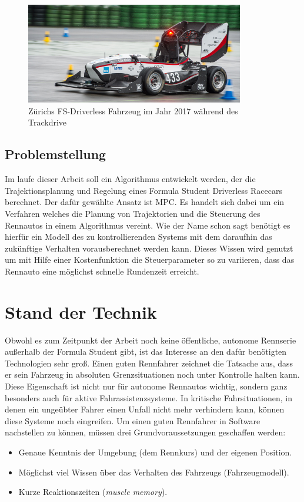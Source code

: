\documentclass{like}
\begin{document}
\begin{figure}[hb!]
	\centering
	\includegraphics[width=270pt]{Abbildungen/amz-driverless-long.jpg}
	\caption{Zürichs FS-Driverless Fahrzeug im Jahr 2017 während des Trackdrive}
\end{figure}

\section{Problemstellung}
Im laufe dieser Arbeit soll ein Algorithmus entwickelt werden, der die Trajektionsplanung und Regelung eines Formula Student Driverless Racecars berechnet. Der dafür gewählte Ansatz ist \acl{MPC}. Es handelt sich dabei um ein Verfahren welches die Planung von Trajektorien und die Steuerung des Rennautos in einem Algorithmus vereint. Wie der Name schon sagt benötigt es hierfür ein Modell des zu kontrollierenden Systems mit dem daraufhin das zukünftige Verhalten vorausberechnet werden kann. Dieses Wissen wird genutzt um mit Hilfe einer Kostenfunktion die Steuerparameter so zu variieren, dass das Rennauto eine möglichst schnelle Rundenzeit erreicht.

\chapter{Stand der Technik}
Obwohl es zum Zeitpunkt der Arbeit noch keine öffentliche, autonome Rennserie außerhalb der Formula Student gibt, ist das Interesse an den dafür benötigten Technologien sehr groß.
Einen guten Rennfahrer zeichnet die Tatsache aus, dass er sein Fahrzeug in absoluten Grenzsituationen noch unter Kontrolle halten kann. Diese Eigenschaft ist nicht nur für autonome Rennautos wichtig, sondern ganz besonders auch für aktive Fahrassistenzsysteme. In kritische Fahrsituationen, in denen ein ungeübter Fahrer einen Unfall nicht mehr verhindern kann, können diese Systeme noch eingreifen. Um einen guten Rennfahrer in Software nachstellen zu können, müssen drei Grundvoraussetzungen geschaffen werden:
\begin{itemize}
	\item Genaue Kenntnis der Umgebung (dem Rennkurs) und der eigenen Position.
	\item Möglichst viel Wissen über das Verhalten des Fahrzeugs (Fahrzeugmodell).
	\item Kurze Reaktionszeiten (\emph{muscle memory}).
\end{itemize}
\end{document}
